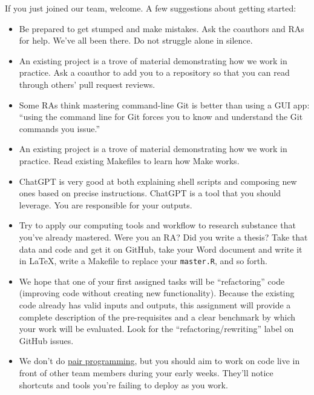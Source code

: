 If you just joined our team, welcome.
A few suggestions about getting started:
\begin{itemize}
\item
Be prepared to get stumped and make mistakes.
Ask the coauthors and RAs for help.
We've all been there.
Do not struggle alone in silence.
\item
An existing project is a trove of material demonstrating how we work in practice.
Ask a coauthor to add you to a repository so that you can read through others' pull request reviews.
\item
Some RAs think mastering command-line Git is better than using a GUI app:
``using the command line for Git forces you to know and understand the Git commands you issue.''
\item
An existing project is a trove of material demonstrating how we work in practice.
Read existing Makefiles to learn how Make works.
\item
ChatGPT is very good at both explaining shell scripts and composing new ones based on precise instructions.
ChatGPT is a tool that you should leverage.
You are responsible for your outputs.
\item
Try to apply our computing tools and workflow to research substance that you've already mastered.
Were you an RA? Did you write a thesis? 
Take that data and code and get it on GitHub, take your Word document and write it in \LaTeX, write a Makefile to replace your \texttt{master.R}, and so forth.
\item
We hope that one of your first assigned tasks will be ``refactoring'' code (improving code without creating new functionality).
Because the existing code already has valid inputs and outputs,
this assignment will provide a complete description of the pre-requisites and a clear benchmark by which your work will be evaluated.
Look for the ``refactoring/rewriting'' label on GitHub issues.
\item
We don't do \href{https://en.wikipedia.org/wiki/Pair_programming}{pair programming},
but you should aim to work on code live in front of other team members during your early weeks.
They'll notice shortcuts and tools you're failing to deploy as you work.
\end{itemize}
